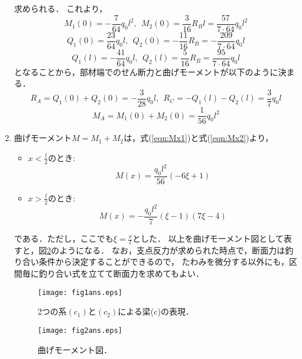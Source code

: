 \documentclass[10pt,a4j]{jarticle}
\begin{document}
\begin{enumerate}
求められる．
これより，
\begin{equation}
	M_1(0)=-\frac{7}{64}q_0l^2, \ \ M_2(0)=\frac{3}{16}R_Bl=\frac{57}{7\cdot 64}q_0l^2
\end{equation}
\begin{equation}
	Q_1(0)=\frac{23}{64}q_0l, \ \ Q_2(0)=-\frac{11}{16}R_B=-\frac{209}{7\cdot 64}q_0l
\end{equation}
\begin{equation}
	Q_1(l)=-\frac{41}{64}q_0l, \ \ Q_2(l)=\frac{5}{16}R_B=\frac{95}{7\cdot 64 }q_0l
\end{equation}
となることから，部材端でのせん断力と曲げモーメントが以下のように決まる．
\begin{equation}
	R_A=Q_1(0)+Q_2(0)= -\frac{3}{28}q_0l, \ \ R_C=-Q_1(l)-Q_2(l)=\frac{3}{7}q_0l
\end{equation}
\begin{equation}
	M_A=M_1(0)+M_2(0)= \frac{1}{56}q_0l^2
\end{equation}
\item
曲げモーメント$M=M_1+M_2$は，式(\ref{eqn:Mx1})と式(\ref{eqn:Mx2})より，
\begin{itemize}
\item
	$x<\frac{l}{2}$のとき:
	\begin{equation}
		M(x)=\frac{q_0l^2}{56}( -6 \xi +1)
		\label{eqn:M_left}
	\end{equation}
\item
	$x>\frac{l}{2}$のとき:
	\begin{equation}
		M(x)=-\frac{q_0l^2}{7}(\xi-1)(7\xi-4)
		\label{eqn:M_right}
	\end{equation}
\end{itemize}
である．ただし，ここでも$\xi=\frac{x}{l}$とした．
以上を曲げモーメント図として表すと，図\ref{fig:fig2}のようになる．
なお，支点反力が求められた時点で，断面力は釣り合い条件から決定することができるので，
たわみを微分する以外にも，区間毎に釣り合い式を立てて断面力を求めてもよい．
\begin{figure}[h]
	\begin{center}
	\texttt{[image: fig1ans.eps]} 
	\end{center}
	\caption{2つの系$(c_1)$と$(c_2)$による梁(c)の表現．}
	\label{fig:fig1}
\end{figure}
\begin{figure}[h]
	\begin{center}
	\texttt{[image: fig2ans.eps]} 
	\end{center}
	\caption{曲げモーメント図．}
	\label{fig:fig2}
\end{figure}
\end{enumerate}
\end{document}
